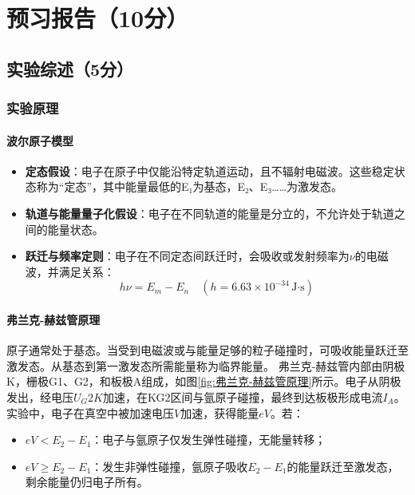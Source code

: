 \documentclass[]{../template/Report}%
\begin{document}
\maketitle%

\section{预习报告（10分）}
\subsection{实验综述（5分）}

\subsubsection{实验原理}
\paragraph{波尔原子模型}
\begin{itemize}
\item \textbf{定态假设}：电子在原子中仅能沿特定轨道运动，且不辐射电磁波。这些稳定状态称为“定态”，其中能量最低的E₁为基态，E₂、E₃……为激发态。
\item \textbf{轨道与能量量子化假设}：电子在不同轨道的能量是分立的，不允许处于轨道之间的能量状态。
\item \textbf{跃迁与频率定则}：电子在不同定态间跃迁时，会吸收或发射频率为$\nu$的电磁波，并满足关系：
\begin{equation}
	h\nu = E_m - E_n \quad (h = 6.63 \times 10^{-34} \, \text{J·s})
\end{equation}
\end{itemize}

\paragraph{弗兰克-赫兹管原理}
原子通常处于基态。当受到电磁波或与能量足够的粒子碰撞时，可吸收能量跃迁至激发态。从基态到第一激发态所需能量称为临界能量。
弗兰克-赫兹管内部由阴极K，栅极G1、G2，和板极A组成，如图\ref{fig:弗兰克-赫兹管原理}所示。电子从阴极发出，经电压$U_G2K$加速，在KG2区间与氩原子碰撞，最终到达板极形成电流$I_A$。
实验中，电子在真空中被加速电压$V$加速，获得能量$eV$。若：
\begin{itemize}
\item $eV < E_2 - E_1$：电子与氩原子仅发生弹性碰撞，无能量转移；
\item $eV \geq E_2 - E_1$：发生非弹性碰撞，氩原子吸收$E_2 - E_1$的能量跃迁至激发态，剩余能量仍归电子所有。
\end{itemize}
\end{document}
